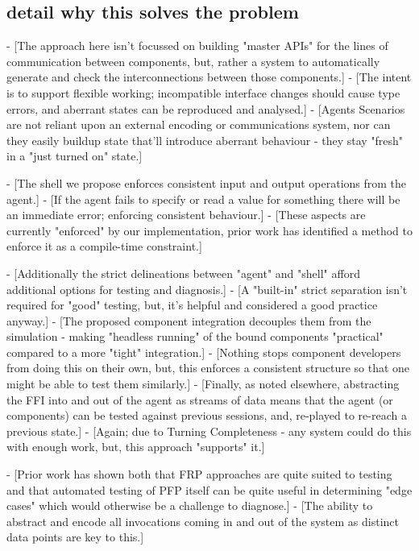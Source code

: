 



\subsection{detail why this solves the problem}

- [The approach here isn't focussed on building "master APIs" for the lines of communication between components, but, rather a system to automatically generate and check the interconnections between those components.]
    - [The intent is to support flexible working; incompatible interface changes should cause type errors, and aberrant states can be reproduced and analysed.]
- [Agents Scenarios are not reliant upon an external encoding or communications system, nor can they easily buildup state that'll introduce aberrant behaviour - they stay "fresh" in a "just turned on" state.]

- [The shell we propose enforces consistent input and output operations from the agent.]
    - [If the agent fails to specify or read a value for something there will be an immediate error; enforcing consistent behaviour.]
- [These aspects are currently "enforced" by our implementation, prior work has identified a method to enforce it as a compile-time constraint.\cite{winograd2012wormholes}]

- [Additionally the strict delineations between "agent" and "shell" afford additional options for testing and diagnosis.]
    - [A "built-in" strict separation isn't required for "good" testing, but, it's helpful and considered a good practice anyway.]
- [The proposed component integration decouples them from the simulation - making "headless running" of the bound components "practical" compared to a more "tight" integration.]
    - [Nothing stops component developers from doing this on their own, but, this enforces a consistent structure so that one might be able to test them similarly.]
- [Finally, as noted elsewhere, abstracting the FFI into and out of the agent as streams of data means that the agent (or components) can be tested against previous sessions, and, re-played to re-reach a previous state.]
    - [Again; due to Turning Completeness - any system could do this with enough work, but, this approach "supports" it.]

- [Prior work has shown both that FRP approaches are quite suited to testing\cite{perez2017testing} and that automated testing of PFP itself can be quite useful in determining "edge cases"\cite{claessen2011quickcheck} which would otherwise be a challenge to diagnose.]
    - [The ability to abstract and encode all invocations coming in and out of the system as distinct data points are key to this.]